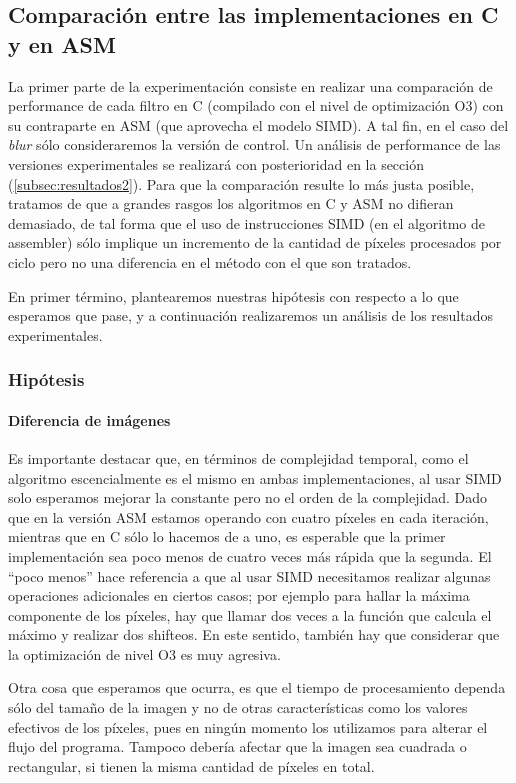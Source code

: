 \subsection{Comparación entre las implementaciones en C y en ASM}
La primer parte de la experimentación consiste en realizar una comparación de performance de cada filtro en C (compilado con el nivel de optimización O3) con su contraparte en ASM (que aprovecha el modelo SIMD). A tal fin, en el caso del \emph{blur} sólo consideraremos la versión de control. Un análisis de performance de las versiones experimentales se realizará con posterioridad en la sección (\ref{subsec:resultados2}). Para que la comparación resulte lo más justa posible, tratamos de que a grandes rasgos los algoritmos en C y ASM no difieran demasiado, de tal forma que el uso de instrucciones SIMD (en el algoritmo de assembler) sólo implique un incremento de la cantidad de píxeles procesados por ciclo pero no una diferencia en el método con el que son tratados.

En primer término, plantearemos nuestras hipótesis con respecto a lo que esperamos que pase, y a continuación realizaremos un análisis de los resultados experimentales.

\subsubsection{Hipótesis}
\paragraph*{Diferencia de imágenes}
Es importante destacar que, en términos de complejidad temporal, como el algoritmo escencialmente es el mismo en ambas implementaciones, al usar SIMD solo esperamos mejorar la constante pero no el orden de la complejidad. Dado que en la versión ASM estamos operando con cuatro píxeles en cada iteración, mientras que en C sólo lo hacemos de a uno, es esperable que la primer implementación sea poco menos de cuatro veces más rápida que la segunda. El ``poco menos''  hace referencia a que al usar SIMD necesitamos realizar algunas operaciones adicionales en ciertos casos; por ejemplo para hallar la máxima componente de los píxeles, hay que llamar dos veces a la función que calcula el máximo y realizar dos shifteos. En este sentido, también hay que considerar que la optimización de nivel O3 es muy agresiva. 

Otra cosa que esperamos que ocurra, es que el tiempo de procesamiento dependa sólo del tamaño de la imagen y no de otras características como los valores efectivos de los píxeles, pues en ningún momento los utilizamos para alterar el flujo del programa. Tampoco debería afectar que la imagen sea cuadrada o rectangular, si tienen la misma cantidad de píxeles en total.

